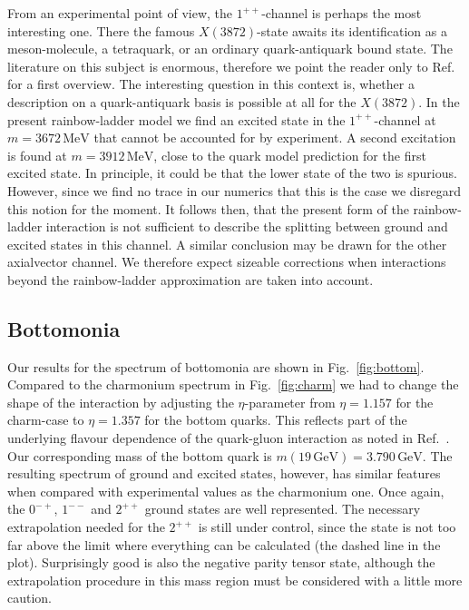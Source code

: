 From an experimental point of view, the $1^{++}$-channel is perhaps the most interesting
one. There the famous $X(3872)$-state awaits its identification as a meson-molecule,
a tetraquark, or an ordinary quark-antiquark bound state. The literature on this
subject is enormous, therefore we point the reader only to Ref.~\cite{Bodwin:2013nua} 
for a first overview. The interesting question in this context is, whether a description
on a quark-antiquark basis is possible at all for the $X(3872)$. In the present
rainbow-ladder model we find an excited state in the $1^{++}$-channel at 
$m = 3672 \,\mbox{MeV}$ that cannot be accounted for by experiment. A second excitation 
is found at $m = 3912 \,\mbox{MeV}$, close to the quark model prediction for the first
excited state. In principle, it could be that the lower state of the two is spurious.
However, since we find no trace in our numerics that this is the case we disregard this
notion for the moment. It follows then, that the present form of the rainbow-ladder 
interaction is not sufficient to describe the splitting between ground and excited states
in this channel. A similar conclusion may be drawn for the other axialvector channel.
We therefore expect sizeable corrections when interactions beyond the 
rainbow-ladder approximation are taken into account. 

\subsection*{Bottomonia}\label{sec:bottom}
Our results for the spectrum of bottomonia are shown in Fig.~\ref{fig:bottom}. Compared to
the charmonium spectrum in Fig.~\ref{fig:charm} we had to change the shape of the interaction
by adjusting the $\eta$-parameter from $\eta=1.157$ for the charm-case to $\eta=1.357$ 
for the bottom quarks. This reflects part of the underlying flavour dependence of the quark-gluon 
interaction as noted in Ref.~\cite{Williams:2014iea}. Our corresponding mass of the bottom quark
is $m(19 \,\mbox{GeV})=3.790 \,\mbox{GeV}$. The resulting spectrum of ground and excited states, 
however, has similar features when compared with experimental values as the charmonium one. 
Once again, the $0^{-+}$, $1^{--}$ and $2^{++}$ ground states are well represented. The necessary
extrapolation needed for the $2^{++}$ is still under control, since the state is not too far above
the limit where everything can be calculated (the dashed line in the plot). Surprisingly good is
also the negative parity tensor state, although the extrapolation procedure in this
mass region must be considered with a little more caution. \\

